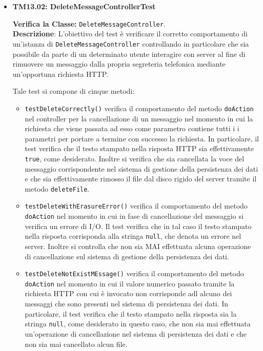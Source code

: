 \begin{itemize}
\begin{itemize}
\end{itemize}


\item[\passed] \textbf{TM13.02: DeleteMessageControllerTest} 

\textbf{Verifica la Classe:} \texttt{DeleteMessageController}.\\
\textbf{Descrizione}: L'obiettivo del test è verificare il corretto comportamento di un'istanza di \texttt{DeleteMessageController} controllando in particolare che sia possibile da parte di un determinato utente interagire con server al fine di rimuovere un messaggio dalla propria segreteria telefonica mediante un'opportuna richiesta HTTP\@.

Tale test si compone di cinque metodi:
\begin{itemize}
\item \texttt{testDeleteCorrectly()} verifica il comportamento del metodo \texttt{doAction} nel controller per la cancellazione di un messaggio nel momento in cui la richiesta che viene passata ad esso come parametro contiene tutti i i parametri per portare a termine con successo la richiesta. In particolare, il test verifica che il testo stampato nella risposta HTTP sia effettivamente \texttt{true}, come desiderato. Inoltre si verifica che sia cancellata la voce del messaggio corrispondente nel sistema di gestione della persistenza dei dati e che sia effettivamente rimosso il file dal disco rigido del server tramite il metodo \texttt{deleteFile}.

\item \texttt{testDeleteWithErasureError()} verifica il comportamento del metodo \texttt{doAction} nel momento in cui in fase di cancellazione del messaggio si verifica un errore di I/O. Il test verifica che in tal caso il testo stampato nella risposta corrisponda alla stringa \texttt{null}, che denota un errore nel server. Inoltre si controlla che non sia MAI effettuata alcuna operazione di cancellazione sul sistema di gestione della persistenza dei dati.

\item \texttt{testDeleteNotExistMEssage()} verifica il comportamento del metodo \texttt{doAction} nel momento in cui il valore numerico passato tramite la richiesta HTTP con cui è invocato non corrisponde adl alcuno dei messaggi che sono presenti nel sistema di persistenza dei dati. In particolare, il test verifica che il testo stampato nella risposta sia la stringa \texttt{null}, come desiderato in questo caso, che non sia mai effettuata un'operazione di cancellazione nel sistema di persistenza dei dati e che non sia mai cancellato alcun file.


\end{itemize}
\end{itemize}
